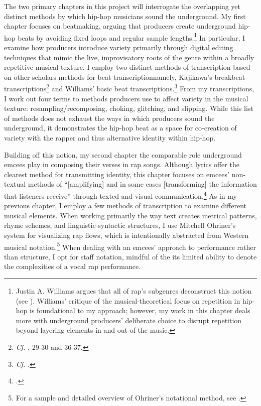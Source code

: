 The two primary chapters in this project will interrogate the overlapping yet distinct methods by which hip-hop
musicians sound the underground. My first chapter focuses on beatmaking, arguing that producers create underground
hip-hop beats by avoiding fixed loops and regular sample lengths.\footnote{
    Justin A. Williams argues that all of rap's subgenres deconstruct this notion (see \cite{justinawilliamsBeatsFlowsResponse2009}).
    Williams' critique of the musical-theoretical focus on repetition in hip-hop is foundational to my approach; however, my work
    in this chapter deals more with underground producers' deliberate choice to disrupt repetition beyond layering elements in and
    out of the music.} 
In particular, I examine how producers introduce variety primarily through digital editing techniques that mimic 
the live, improvisatory roots of the genre within a broadly repetitive musical texture. I employ two distinct methods of
transcription based on other scholars methods for beat transcription\textemdash namely, Kajikawa's breakbeat 
transcriptions\footnote{
    \textit{Cf.} \autocite[29--30 and 36--37]{lorenkajikawaSoundingRaceRap2015}, 29-30  and 36-37.} 
and Williams' basic beat transcriptions.\footnote{
    \textit{Cf.} \autocite[61ff]{justinawilliamsRhyminStealinMusical2013}.} 
From my transcriptions, I work out four terms to methods producers use to affect variety in the musical texture: 
resampling/recomposing, choking, glitching, and slipping. While this list of methods does not exhaust the ways in which
producers sound the underground, it demonstrates the hip-hop beat as a space for co-creation of variety with the rapper
and thus alternative identity within hip-hop.

Building off this notion, my second chapter the comparable role underground emcees play in composing their verses in rap
songs. Although lyrics offer the clearest method for transmitting identity, this chapter focuses on emcees' non-textual 
methods of ``[amplifying] and in some cases [transforming] the information that listeners receive'' through texted and visual
communication.\footnote{
    \autocite[12]{lorenkajikawaSoundingRaceRap2015}.} 
As in my previous chapter, I employ a few methods of transcription to examine different musical elements. When working primarily
the way text creates metrical patterns, rhyme schemes, and linguistic-syntactic structures, I use Mitchell Ohriner's system for
visualizing rap flows, which is intentionally abstracted from Western musical notation.\footnote{
    For a sample and detailed overview of Ohriner's notational method, see \autocite[xxvii--xl]{mitchellohrinerFlowRhythmicVoice2019}.}
When dealing with an emcees' approach to performance rather than structure, I opt for staff notation, mindful of the its limited
ability to denote the complexities of a vocal rap performance.
